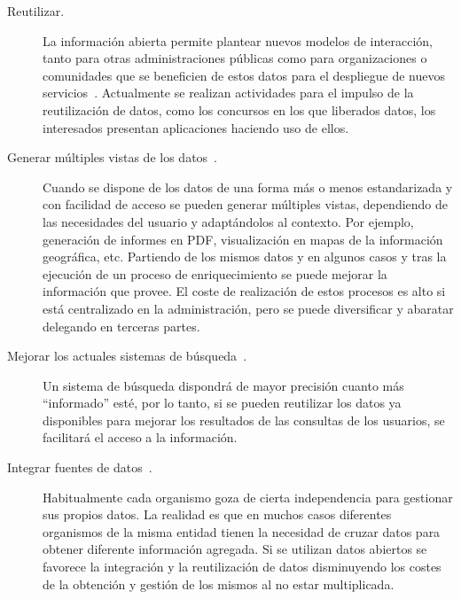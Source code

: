 \begin{description}
\item [Reutilizar.] La información abierta permite plantear nuevos modelos de interacción, tanto para otras administraciones públicas
como para organizaciones o comunidades que se beneficien de estos datos para el despliegue de nuevos servicios~\cite{web20}. Actualmente
se realizan actividades para el impulso de la reutilización de datos, como los concursos en los que liberados datos, los interesados 
presentan aplicaciones haciendo uso de ellos.
 \item [Generar múltiples vistas de los datos~\cite{DBLP:journals/semweb/DadzieR11}.] Cuando se dispone de los datos de una forma más o menos estandarizada y con facilidad
de acceso se pueden generar múltiples vistas, dependiendo de las necesidades del usuario y adaptándolos al contexto. Por ejemplo,
generación de informes en PDF, visualización en mapas de la información geográfica, etc. Partiendo de los mismos datos y en algunos
casos y tras la ejecución de un proceso de enriquecimiento se puede mejorar la información que provee. El coste de realización de 
estos procesos es alto si está centralizado en la administración, pero se puede diversificar y abaratar delegando en 
terceras partes.
 \item [Mejorar los actuales sistemas de búsqueda~\cite{hoga-etal-2011-swse-JWS}.] Un sistema de búsqueda dispondrá de mayor precisión cuanto más ``informado'' esté, por lo tanto,
si se pueden reutilizar los datos ya disponibles para mejorar los resultados de las consultas de los usuarios, se facilitará el acceso a la
información.
  \item [Integrar fuentes de datos~\cite{Andreas_Schultz_Isele_Bizer_Becker_2011,Harth:2011:SIP:1963192.1963318}.] Habitualmente cada organismo goza de cierta independencia para gestionar sus propios datos. La realidad
es que en muchos casos diferentes organismos de la misma entidad tienen la necesidad de cruzar datos para obtener diferente información
agregada. Si se utilizan datos abiertos se favorece la integración y la reutilización de datos disminuyendo los costes de la obtención
y gestión de los mismos al no estar multiplicada.
\end{description}

